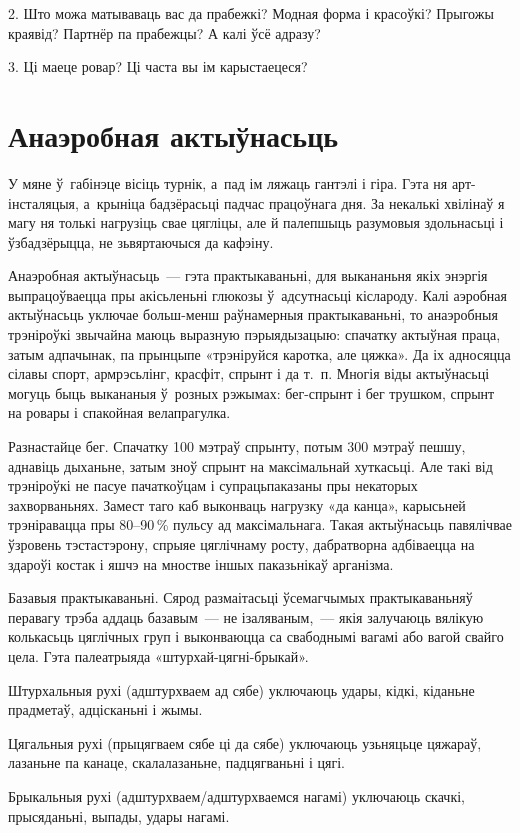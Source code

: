 2. Што можа матываваць вас да прабежкі? Модная форма і красоўкі? Прыгожы краявід? Партнёр па прабежцы? А калі ўсё адразу?

3. Ці маеце ровар? Ці часта вы ім карыстаецеся?


\section{Анаэробная актыўнасьць}

У мяне ў~габінэце вісіць турнік, а~пад ім ляжаць гантэлі і гіра. Гэта ня арт-інсталяцыя, а~крыніца бадзёрасьці падчас працоўнага дня. За некалькі хвілінаў я магу ня толькі нагрузіць свае цягліцы, але й палепшыць разумовыя здольнасьці і ўзбадзёрыцца, не зьвяртаючыся да кафэіну.

Анаэробная актыўнасьць~--- гэта практыкаваньні, для выкананьня якіх энэргія выпрацоўваецца пры акісьленьні глюкозы ў~адсутнасьці кіслароду. Калі аэробная актыўнасьць уключае больш-менш раўнамерныя практыкаваньні, то анаэробныя трэніроўкі звычайна маюць выразную пэрыядызацыю: спачатку актыўная праца, затым адпачынак, па прынцыпе «трэніруйся каротка, але цяжка». Да іх адносяцца сілавы спорт, армрэсьлінг, красфіт, спрынт і да т.~п. Многія віды актыўнасьці могуць быць выкананыя ў~розных рэжымах: бег-спрынт і бег трушком, спрынт на ровары і спакойная велапрагулка.

Разнастайце бег. Спачатку 100 мэтраў спрынту, потым 300 мэтраў пешшу, аднавіць дыханьне, затым зноў спрынт на максімальнай хуткасьці. Але такі від трэніроўкі не пасуе пачаткоўцам і супрацьпаказаны пры некаторых захворваньнях. Замест таго каб выконваць нагрузку «да канца», карысьней трэніравацца пры 80--90\,\% пульсу ад максімальнага. Такая актыўнасьць павялічвае ўзровень тэстастэрону, спрыяе цяглічнаму росту, дабратворна адбіваецца на здароўі костак і яшчэ на мностве іншых паказьнікаў арганізма.

Базавыя практыкаваньні. Сярод размаітасьці ўсемагчымых практыкаваньняў перавагу трэба аддаць базавым~--- не ізаляваным,~--- якія залучаюць вялікую колькасьць цяглічных груп і выконваюцца са свабоднымі вагамі або вагой свайго цела. Гэта палеатрыяда «штурхай-цягні-брыкай». 

Штурхальныя рухі (адштурхваем ад сябе) уключаюць удары, кідкі, кіданьне прадметаў, адцісканьні і жымы. 

Цягальныя рухі (прыцягваем сябе ці да сябе) уключаюць узьняцьце цяжараў, лазаньне па канаце, скалалазаньне, падцягваньні і цягі. 

Брыкальныя рухі (адштурхваем/адштурхваемся нагамі) уключаюць скачкі, прысяданьні, выпады, удары нагамі. 

